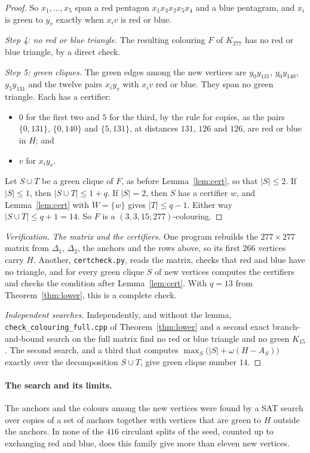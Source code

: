 \documentclass[11pt]{article}
\theoremstyle{spacedplain}
\theoremstyle{spaceddef}
\theoremstyle{spacedremark}
\begin{document}
\begin{proof}
So $x_1,\dots,x_5$ span a red pentagon $x_1x_3x_2x_5x_4$ and a blue pentagram, and $x_i$ is green to $y_v$ exactly when $x_iv$ is red or blue.

\emph{Step 4: no red or blue triangle.}
The resulting colouring $F$ of $K_{277}$ has no red or blue triangle, by a direct check.

\emph{Step 5: green cliques.}
The green edges among the new vertices are $y_0y_{131}$, $y_0y_{140}$, $y_5y_{131}$ and the twelve pairs $x_iy_v$ with $x_iv$ red or blue.
They span no green triangle.
Each has a certifier:
\begin{itemize}
\item $0$ for the first two and $5$ for the third, by the rule for copies, as the pairs $\{0,131\}$, $\{0,140\}$ and $\{5,131\}$, at distances $131$, $126$ and $126$, are red or blue in $H$; and
\item $v$ for $x_iy_v$.
\end{itemize}
Let $S\cup T$ be a green clique of $F$, as before Lemma~\ref{lem:cert}, so that $|S|\le 2$.
If $|S|\le 1$, then $|S\cup T|\le 1+q$.
If $|S|=2$, then $S$ has a certifier $w$, and Lemma~\ref{lem:cert} with $W=\{w\}$ gives $|T|\le q-1$.
Either way $|S\cup T|\le q+1=14$.
So $F$ is a $(3,3,15;277)$-colouring.
\end{proof}

\begin{proof}[Verification]
\emph{The matrix and the certifiers.}
One program rebuilds the $277\times 277$ matrix from $\Delta_1$, $\Delta_2$, the anchors and the rows above, so its first $266$ vertices carry $H$.
Another, \texttt{certcheck.py}, reads the matrix, checks that red and blue have no triangle, and for every green clique $S$ of new vertices computes the certifiers and checks the condition after Lemma~\ref{lem:cert}.
With $q=13$ from Theorem~\ref{thm:lower}, this is a complete check.

\emph{Independent searches.}
Independently, and without the lemma, \texttt{check\_colouring\_full.cpp} of Theorem~\ref{thm:lower} and a second exact branch-and-bound search on the full matrix find no red or blue triangle and no green $K_{15}$.
The second search, and a third that computes $\max_S\big(|S|+\omega(H-A_S)\big)$ exactly over the decomposition $S\cup T$, give green clique number $14$.
\end{proof}

\paragraph{The search and its limits.}
The anchors and the colours among the new vertices were found by a SAT search over copies of a set of anchors together with vertices that are green to $H$ outside the anchors.
In none of the $416$ circulant splits of the seed, counted up to exchanging red and blue, does this family give more than eleven new vertices.
\end{document}
